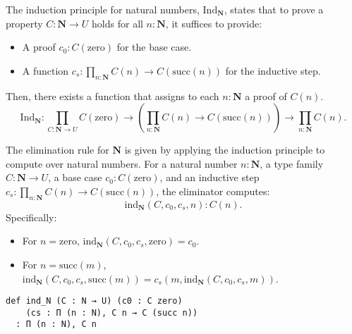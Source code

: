\documentclass{article}
\begin{document}
\begin{definition}
The induction principle for natural numbers, $\mathrm{Ind}_\mathbf{N}$, states that to prove a property $C : \mathbf{N} \rightarrow U$ holds for all $n : \mathbf{N}$, it suffices to provide:
\begin{itemize}
    \item A proof $c_0 : C(\mathrm{zero})$ for the base case.
    \item A function $c_s : \prod_{n : \mathbf{N}} C(n) \rightarrow C(\mathrm{succ}(n))$ for the inductive step.
\end{itemize}
Then, there exists a function that assigns to each $n : \mathbf{N}$ a proof of $C(n)$.
\[
\mathrm{Ind}_\mathbf{N} : \prod_{C : \mathbf{N} \rightarrow U} C(\mathrm{zero}) \rightarrow \left( \prod_{n : \mathbf{N}} C(n) \rightarrow C(\mathrm{succ}(n)) \right) \rightarrow \prod_{n : \mathbf{N}} C(n).
\]
\end{definition}

\begin{definition}
The elimination rule for $\mathbf{N}$ is given by applying the induction principle to compute over natural numbers. For a natural number $n : \mathbf{N}$, a type family $C : \mathbf{N} \rightarrow U$, a base case $c_0 : C(\mathrm{zero})$, and an inductive step $c_s : \prod_{n : \mathbf{N}} C(n) \rightarrow C(\mathrm{succ}(n))$, the eliminator computes:
\[
\mathrm{ind}_\mathbf{N}(C, c_0, c_s, n) : C(n).
\]
Specifically:
\begin{itemize}
    \item For $n = \mathrm{zero}$, $\mathrm{ind}_\mathbf{N}(C, c_0, c_s, \mathrm{zero}) = c_0$.
    \item For $n = \mathrm{succ}(m)$, $\mathrm{ind}_\mathbf{N}(C, c_0, c_s, \mathrm{succ}(m)) = c_s(m, \mathrm{ind}_\mathbf{N}(C, c_0, c_s, m))$.
\end{itemize}
\begin{lstlisting}[mathescape=true]
def ind_N (C : N → U) (c0 : C zero)
    (cs : Π (n : N), C n → C (succ n))
  : П (n : N), C n
\end{lstlisting}
\end{definition}
\end{document}
